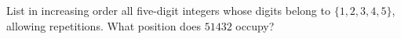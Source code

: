 List in increasing order all five-digit integers whose digits belong to $\{1,2,3,4,5\}$, allowing repetitions. What position does $51432$ occupy?
